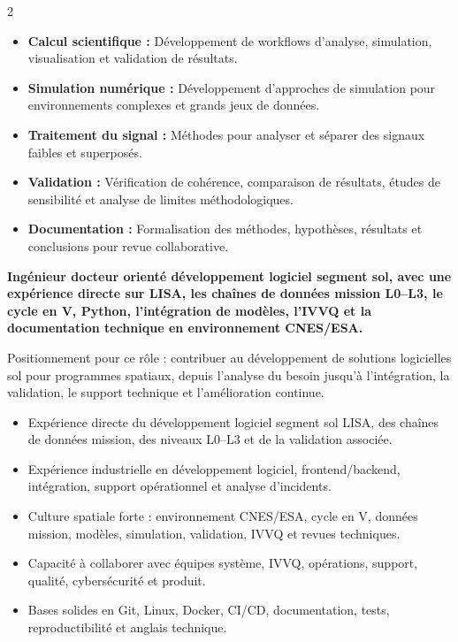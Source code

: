 \documentclass[8pt,a4paper,ragged2e,withhyper]{altacv}
\begin{document}
\begin{paracol}{2}
\begin{itemize}
  \item \textbf{Calcul scientifique :} Développement de workflows d’analyse, simulation, visualisation et validation de résultats.
  \item \textbf{Simulation numérique :} Développement d’approches de simulation pour environnements complexes et grands jeux de données.
  \item \textbf{Traitement du signal :} Méthodes pour analyser et séparer des signaux faibles et superposés.
  \item \textbf{Validation :} Vérification de cohérence, comparaison de résultats, études de sensibilité et analyse de limites méthodologiques.
  \item \textbf{Documentation :} Formalisation des méthodes, hypothèses, résultats et conclusions pour revue collaborative.
\end{itemize}

\switchcolumn


\textbf{Ingénieur docteur orienté développement logiciel segment sol, avec une expérience directe sur LISA, les chaînes de données mission L0--L3, le cycle en V, Python, l’intégration de modèles, l’IVVQ et la documentation technique en environnement CNES/ESA.}

Positionnement pour ce rôle : contribuer au développement de solutions logicielles sol pour programmes spatiaux, depuis l’analyse du besoin jusqu’à l’intégration, la validation, le support technique et l’amélioration continue.

\begin{itemize}
  \item Expérience directe du développement logiciel segment sol LISA, des chaînes de données mission, des niveaux L0--L3 et de la validation associée.
  \item Expérience industrielle en développement logiciel, frontend/backend, intégration, support opérationnel et analyse d’incidents.
  \item Culture spatiale forte : environnement CNES/ESA, cycle en V, données mission, modèles, simulation, validation, IVVQ et revues techniques.
  \item Capacité à collaborer avec équipes système, IVVQ, opérations, support, qualité, cybersécurité et produit.
  \item Bases solides en Git, Linux, Docker, CI/CD, documentation, tests, reproductibilité et anglais technique.
\end{itemize}


\end{paracol}
\end{document}
